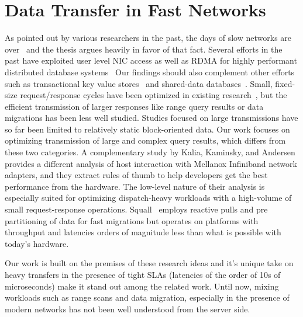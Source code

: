 \section{Data Transfer in Fast Networks}
As pointed out by various researchers in the past, the days of slow networks are over~\cite{slow}
and the thesis argues heavily in favor of that fact. Several efforts in the past have exploited
user level NIC access as well as RDMA for highly performant distributed database systems~\cite{ramcloud,farm,farmtx,drtm,hyper}
Our findings should also complement other efforts such as transactional key value stores~\cite{deuteronomy} 
and shared-data databases~\cite{tell}. Small, fixed-size request/response cycles have been optimized in
existing research~\cite{farm,herd,mica,rdma,ramcloud}, but the efficient
transmission of larger responses like range query results or data
migrations has been less well studied. Studies focused on large transmissions
have so far been limited to relatively static block-oriented data.
Our work focuses on optimizing transmission of large and complex query
results, which differs from these two categories. A complementary study by Kalia, Kaminsky, and Andersen~\cite{rdma} provides a
different analysis of host interaction with Mellanox Infiniband network adapters,
and they extract rules of thumb to help developers get the best performance from the hardware.
The low-level nature of their analysis is especially suited for
optimizing dispatch-heavy workloads with a high-volume of small
request-response operations. Squall~\cite{squall} employs reactive pulls and pre partitioning
of data for fast migrations but operates on platforms with throughput and latencies orders of 
magnitude less than what is possible with today's hardware.

Our work is built on the premises of these research ideas and it's unique take on
heavy transfers in the presence of tight SLAs (latencies of the order of 10s of microseconds)
make it stand out among the related work. Until now, mixing workloads such as range scans 
and data migration, especially in the presence of modern networks has not been well
 understood from the server side.